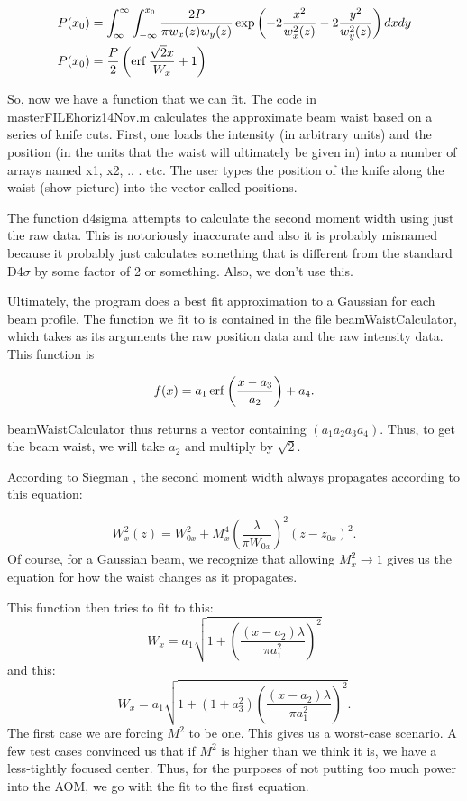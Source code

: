 \begin{align}
P(x_0)&=\int_{\infty}^{\infty}\int_{-\infty}^{x_0} \frac{2 P}{\pi w_x(z) w_y(z)}\exp \left(-2\frac{x^2}{w_x^2(z)}-2\frac{y^2}{w_y^2(z)}\right) dx dy\\
P(x_0)&=\frac{P}{2} \left(\operatorname{erf} \frac{\sqrt{2} x}{W_x}+1 \right)
\end{align}

So, now we have a function that we can fit. The code in masterFILEhoriz14Nov.m calculates the approximate beam waist based on a series of knife cuts. First, one loads the intensity (in arbitrary units) and the position (in the units that the waist will ultimately be given in) into a number of arrays named x1, x2, .. . etc. The user types the position of the knife along the waist (show picture) into the vector called positions. 

The function d4sigma attempts to calculate the second moment width using just the raw data. This is notoriously inaccurate and also it is probably misnamed because it probably just calculates something that is different from the standard D4$\sigma$ by some factor of 2 or something. Also, we don't use this. 

Ultimately, the program does a best fit approximation to a Gaussian for each beam profile. The function we fit to is contained in the file beamWaistCalculator, which takes as its arguments the raw position data and the raw intensity data. This function is 

\begin{equation}
f(x)=a_1 \operatorname{erf} \left(\frac{x-a_3}{a_2}\right)+a_4.
\end{equation}

beamWaistCalculator thus returns a vector containing $(a_1 a_2 a_3 a_4)$. Thus, to get the beam waist, we will take $a_2$ and multiply by $\sqrt{2}$. 

According to Siegman \cite{SiegmanBeamQuality}, the second moment width always propagates according to this equation: 

\begin{equation}
W_x^2(z)=W_{0x}^2 + M_x^4 \left( \frac{\lambda}{\pi W_{0x}}\right)^2 (z-z_{0x})^2. 
\end{equation}
Of course, for a Gaussian beam, we recognize that allowing $M_x^2\rightarrow 1$ gives us the equation for how the waist changes as it propagates. 

This function then tries to fit to this:
\begin{equation}
W_x=a_1 \sqrt{1+\left(\frac{(x-a_2) \lambda}{\pi a_1^2}\right)^2}
\end{equation}
and this:
\begin{equation}
W_x=a_1 \sqrt{1+(1+a_3^2) \left(\frac{(x-a_2) \lambda}{\pi a_1^2}\right)^2}. 
\end{equation}
The first case we are forcing $M^2$ to be one. This gives us a worst-case scenario. A few test cases convinced us that if $M^2$ is higher than we think it is, we have a less-tightly focused center. Thus, for the purposes of not putting too much power into the AOM, we go with the fit to the first equation. 

